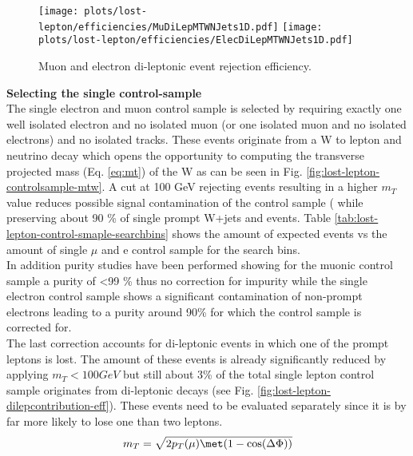 \begin{figure}[h]
  \centering
  \texttt{[image: plots/lost-lepton/efficiencies/MuDiLepMTWNJets1D.pdf]}
  \texttt{[image: plots/lost-lepton/efficiencies/ElecDiLepMTWNJets1D.pdf]}
  \caption{Muon and electron di-leptonic \ttbar event rejection efficiency.}
  \label{fig:lost-lepton-dilep-eff}
\end{figure}


{\bf Selecting the single control-sample}\\
The single electron and muon control sample is selected by requiring exactly one well isolated electron and no isolated muon (or one isolated muon and no isolated electrons) and no isolated tracks. 
These events originate from a W to lepton and neutrino decay which opens the opportunity to computing the transverse projected mass (Eq. \ref{eq:mt}) of the W as can be seen in Fig. \ref{fig:lost-lepton-controlsample-mtw}. A cut at 100 GeV rejecting events resulting in a higher $m_T$ value reduces possible signal contamination of the control sample ( while preserving about 90 \% of single prompt W+jets and \ttbar events. Table \ref{tab:lost-lepton-control-smaple-searchbins} shows the amount of expected events vs the amount of single $\mu$ and e control sample for the search bins.\\
In addition purity studies have been performed showing for the muonic control sample a purity of <99 \% thus no correction for impurity while the single electron control sample shows a significant contamination of non-prompt electrons leading to a purity around 90\% for which the control sample is corrected for.\\
The last correction accounts for di-leptonic events in which one of the prompt leptons is lost. The amount of these events is already significantly reduced by applying $m_T < 100 GeV$ but still about 3\% of the total single lepton control sample originates from di-leptonic \ttbar decays (see Fig. \ref{fig:lost-lepton-dilepcontribution-eff}). These events need to be evaluated separately since it is by far more likely to lose one than two leptons.
\begin{equation}
  m_{T} = \sqrt{2 p_{T}(\mu) \met (1 - \cos(\Delta \Phi))}
  \label{eq:mt}
\end{equation}

